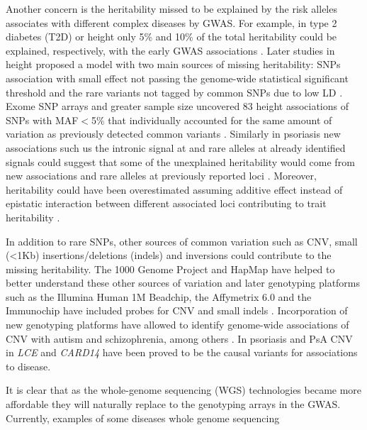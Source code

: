 Another concern is the heritability missed to be explained by the risk alleles associates with different complex diseases by GWAS. For example, in type 2 diabetes (T2D) or height only 5\% and 10\% of the total heritability could be explained, respectively, with the early GWAS associations \parencite{Ku2010, Yang2010}. Later studies in height proposed a model with two main sources of missing heritability: SNPs association with small effect not passing the genome-wide statistical significant threshold and the rare variants not tagged by common SNPs due to low LD \parencite{Yang2010}. Exome SNP arrays and greater sample size uncovered 83 height associations of SNPs with MAF${<}$5\% that individually accounted for the same amount of variation as previously detected common variants \parencite{Marouli2017}. Similarly in psoriasis new associations such us the intronic signal at \parencite{TNFSF15} and rare alleles at already identified signals could suggest that  some of the unexplained heritability would come from new associations and rare alleles at previously reported loci \parencite{Dand2017.}. Moreover, heritability could have been overestimated assuming additive effect instead of epistatic interaction between different associated loci contributing to trait heritability \parencite{Zuk2012}.

In addition to rare SNPs, other sources of common variation such as CNV, small (<1Kb) insertions/deletions (indels) and inversions could contribute to the missing heritability. The 1000 Genome Project and HapMap have helped to better understand these other sources of variation and later genotyping platforms such as the Illumina Human 1M Beadchip, the Affymetrix 6.0 and the Immunochip have included probes for CNV and small indels \parencite{Ku2010}. Incorporation of new genotyping platforms have allowed to identify genome-wide associations of CNV with autism and schizophrenia, among others \parencite{Glessner2009,Marshall2017}. In psoriasis and PsA CNV in \textit{LCE} and \textit{CARD14} have been proved to be the causal variants for associations to disease.


It is clear that as the whole-genome sequencing (WGS) technologies became more affordable they will naturally replace to the genotyping arrays in the GWAS. Currently, examples of some diseases whole genome sequencing

